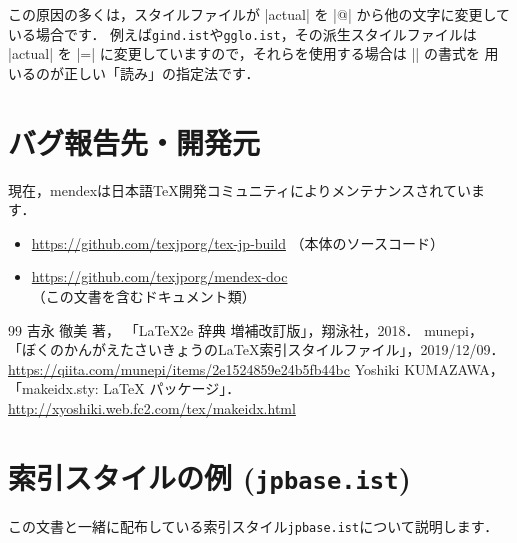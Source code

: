 \documentclass[a4paper,dvipdfmx]{jsarticle}
\newcommand{\SoftName}[1]{\textsf{#1}}
\newcommand{\FileName}[1]{\texttt{#1}}
\begin{document}
この原因の多くは，スタイルファイルが |actual| を |@| から他の文字に変更している場合です．
例えば\FileName{gind.ist}や\FileName{gglo.ist}，その派生スタイルファイルは
|actual| を |=| に変更していますので，それらを使用する場合は || の書式を
用いるのが正しい「読み」の指定法です．

\section{バグ報告先・開発元}
現在，\SoftName{mendex}は日本語\TeX 開発コミュニティによりメンテナンスされています．
\begin{itemize}
  \item \url{https://github.com/texjporg/tex-jp-build} （本体のソースコード）
  \item \url{https://github.com/texjporg/mendex-doc} （この文書を含むドキュメント類）
\end{itemize}

\begin{thebibliography}{99}
  吉永 徹美 著，
   「LaTeX2e 辞典 増補改訂版」，翔泳社，2018．
  munepi，
   「ぼくのかんがえたさいきょうのLaTeX索引スタイルファイル」，2019/12/09．\\
   \url{https://qiita.com/munepi/items/2e1524859e24b5fb44bc}
  Yoshiki KUMAZAWA，
   「makeidx.sty: LaTeX パッケージ」．\\
   \url{http://xyoshiki.web.fc2.com/tex/makeidx.html}
\end{thebibliography}

\clearpage
\appendix

\section{索引スタイルの例 (\FileName{jpbase.ist})}
この文書と一緒に配布している索引スタイル\FileName{jpbase.ist}について説明します．
\end{document}

